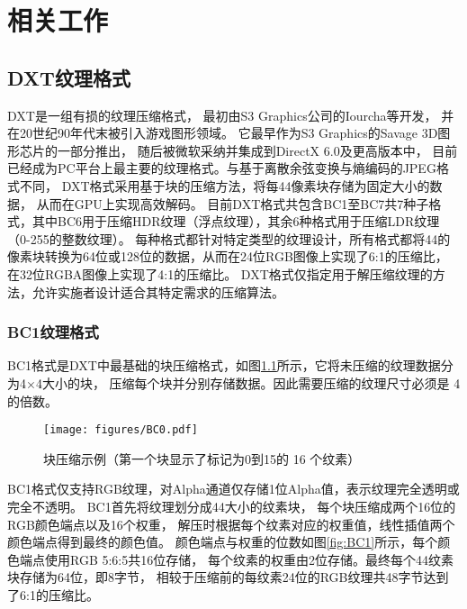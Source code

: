 
\chapter{相关工作}

\section{DXT纹理格式}

DXT是一组有损的纹理压缩格式，
最初由S3 Graphics公司的Iourcha等\cite{iourcha1999system}开发，
并在20世纪90年代末被引入游戏图形领域。
它最早作为S3 Graphics的Savage 3D图形芯片的一部分推出，
随后被微软采纳并集成到DirectX 6.0及更高版本中，
目前已经成为PC平台上最主要的纹理格式。与基于离散余弦变换与熵编码的JPEG格式不同，
DXT格式采用基于块的压缩方法，将每4\times4像素块存储为固定大小的数据，
从而在GPU上实现高效解码。
目前DXT格式共包含BC1至BC7共7种子格式，其中BC6用于压缩HDR纹理（浮点纹理），其余6种格式用于压缩LDR纹理（0-255的整数纹理）。
每种格式都针对特定类型的纹理设计，所有格式都将4\times4的像素块转换为64位或128位的数据，从而在24位RGB图像上实现了6:1的压缩比，
在32位RGBA图像上实现了4:1的压缩比。
DXT格式仅指定用于解压缩纹理的方法，允许实施者设计适合其特定需求的压缩算法。

\subsection{BC1纹理格式}

BC1格式是DXT中最基础的块压缩格式，如图\ref{fig:BlockCompression}所示，它将未压缩的纹理数据分为4×4大小的块，
压缩每个块并分别存储数据。因此需要压缩的纹理尺寸必须是 4 的倍数。

\begin{figure}[htbp]
    \centering
    \texttt{[image: figures/BC0.pdf]}
    \caption{块压缩示例（第一个块显示了标记为0到15的 16 个纹素）\cite{BC1-5}}
    \label{fig:BlockCompression}
\end{figure}

BC1格式仅支持RGB纹理，对Alpha通道仅存储1位Alpha值，表示纹理完全透明或完全不透明。
BC1首先将纹理划分成4\times4大小的纹素块，
每个块压缩成两个16位的RGB颜色端点以及16个权重，
解压时根据每个纹素对应的权重值，线性插值两个颜色端点得到最终的颜色值。
颜色端点与权重的位数如图\ref{fig:BC1}所示，每个颜色端点使用RGB 5:6:5共16位存储，
每个纹素的权重由2位存储。最终每个4\times4纹素块存储为64位，即8字节，
相较于压缩前的每纹素24位的RGB纹理共48字节达到了6:1的压缩比。

